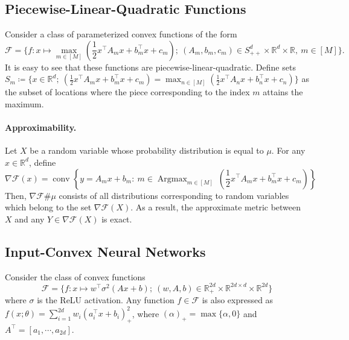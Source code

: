 \documentclass[10pt]{article}
\newcommand{\op}[1]{\operatorname{#1}}
\newcommand{\real}{\mathbb{R}}
\newcommand{\calF}{\mathcal{F}}
\numberwithin{equation}{section}
\begin{document}
\subsection{Piecewise-Linear-Quadratic Functions}\label{sec:restr-PLQ}
Consider a class of parameterized convex functions of the form \[\calF = \{f:x\mapsto \max_{m\in [M]} (\frac{1}{2}x^\top A_m x + b_m^\top x + c_m);~(A_m,b_m,c_m) \in S^d_{++} \times \real^d \times \real,~ m \in [M] \}.\] 
It is easy to see that these functions are piecewise-linear-quadratic. 
Define sets $S_m \coloneqq \{x \in \real^d;~(\frac{1}{2}x^\top A_m x + b_m^\top x + c_m) = \max_{n\in[M]}(\frac{1}{2}x^\top A_n x + b_n^\top x + c_n)\}$ as the subset of locations where the piece corresponding to the index $m$ attains the maximum. 
\paragraph{Approximability.}
{Let $X$ be a random variable whose probability distribution is equal to $\mu$. For any $x\in\real^d$, define 
\[
\nabla \calF (x)= \op{conv}\left\{y = A_{m}x + b_{m}:~ m\in \op{Argmax}_{m\in[M]}~(\frac{1}{2}x^\top A_m x + b_m^\top x + c_m)\right\}
\]
Then, $\nabla \calF \# \mu$ consists of all distributions corresponding to random variables which belong to the set $\nabla \calF (X)$. As a result, the approximate metric between $X$ and any $Y \in \nabla \calF (X)$ is exact.}



\subsection{Input-Convex Neural Networks}\label{sec:restr-ICNN}%
Consider the class of convex functions \[\calF = \{f:x\mapsto w^\top \sigma^2(Ax+b) ;~ (w,A,b)\in \real^{2d}_+ \times \real^{2d\times d} \times \real^{2d}\}\] where $\sigma$ is the ReLU activation. Any function $f\in \calF$ is also expressed as $f(x;\theta) = \sum_{i=1}^{2d} w_i(a_i^\top x+b_i)_+^2$, where $(\alpha)_+= \max\{\alpha,0\}$ and $A^\top = [a_1, \cdots, a_{2d}]$. 
\end{document}
